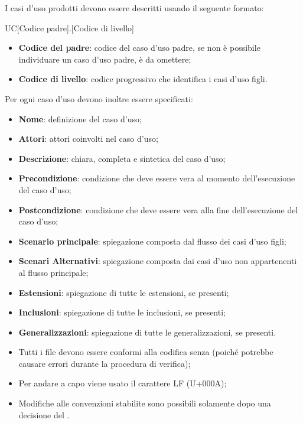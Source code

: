 I casi d'uso prodotti devono essere descritti usando il seguente formato:
\begin{center}
UC[Codice padre].[Codice di livello]
\end{center}
\begin{itemize}
\item \textbf{Codice del padre}: codice del caso d'uso padre, se non è possibile individuare un caso d'uso padre, è da omettere;
\item \textbf{Codice di livello}: codice progressivo che identifica i casi d'uso figli.
\end{itemize}
Per ogni caso d'uso devono inoltre essere specificati:
\begin{itemize}
\item \textbf{Nome}: definizione del caso d'uso;
\item \textbf{Attori}: attori coinvolti nel caso d'uso;
\item \textbf{Descrizione}: chiara, completa e sintetica del caso d'uso;
\item \textbf{Precondizione}: condizione che deve essere vera al momento dell'esecuzione del caso d'uso;
\item \textbf{Postcondizione}: condizione che deve essere vera alla fine dell'esecuzione del caso d'uso;
\item \textbf{Scenario principale}: spiegazione composta dal flusso dei casi d'uso figli;
\item \textbf{Scenari Alternativi}: spiegazione composta dai casi d'uso non appartenenti al flusso principale;
\item \textbf{Estensioni}: spiegazione di tutte le estensioni, se presenti;
\item \textbf{Inclusioni}: spiegazione di tutte le inclusioni, se presenti;
\item \textbf{Generalizzazioni}: spiegazione di tutte le generalizzazioni, se presenti.
\end{itemize}

\label{codificaConvenzioniFile}
\begin{itemize}
\item Tutti i file devono essere conformi alla codifica  senza  (poiché potrebbe causare errori durante la procedura di verifica);
\item Per andare a capo viene usato il carattere LF (U+000A);
\item Modifiche alle convenzioni stabilite sono possibili solamente dopo una decisione del \rRP.
\end{itemize}
